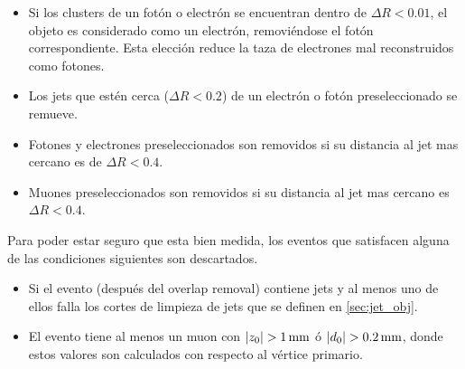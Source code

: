 \begin{itemize}\itemsep0.1cm
\item Si los clusters de un fotón o electrón se encuentran dentro de $\Delta R < 0.01$,
  el objeto es considerado como un electrón, removiéndose el fotón correspondiente. Esta
  elección reduce la taza de electrones mal reconstruidos como fotones.
\item Los jets que estén cerca ($\Delta R<0.2$) de un electrón o fotón preseleccionado
  se remueve.
\item Fotones y electrones preseleccionados son removidos si su distancia al jet mas
  cercano es de $\Delta R < 0.4$.
\item Muones preseleccionados son removidos si su distancia al jet mas cercano es $\Delta R < 0.4$.
\end{itemize}

Para poder estar seguro que {\met} esta bien medida, los eventos que satisfacen
alguna de las condiciones siguientes son descartados.
\begin{itemize}\itemsep0.1cm
\item Si el evento (después del overlap removal) contiene jets y al menos uno de ellos
  falla los cortes de limpieza de jets que se definen en \cref{sec:jet_obj}.
\item El evento tiene al menos un muon con  $|z_{0}| >   \unit[1]{mm}$ ó
  $|d_0| > \unit[0.2]{mm}$, donde estos valores son calculados con respecto al vértice
  primario.
\end{itemize}


